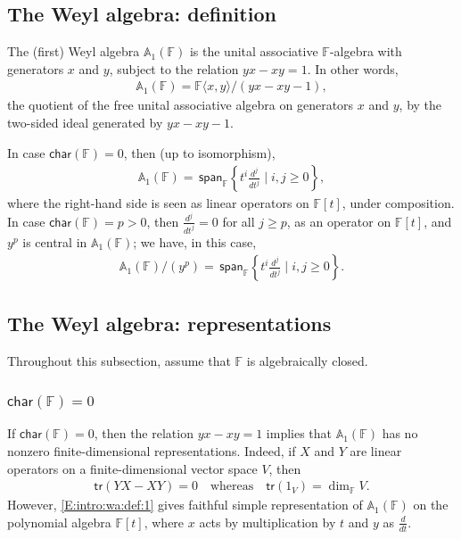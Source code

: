 \documentclass{commat}
\newcommand\tr{\mathsf{tr}}
\newcommand{\FF}{\mathbb{F}}
\newcommand{\wa}[1][1]{\mathbb{A}_{#1}}
\newcommand\chara{\mathsf {char}}
\newcommand\spann{\, \mathsf{span}}
\newcommand{\pb}[1]{\left\{ #1\right\}}
\newcommand{\seq}[1]{\left( #1\right)}
\begin{document}
\subsection{The Weyl algebra: definition}\label{SS:intro:wa:def}




The (first) Weyl algebra $\wa(\FF)$ is the unital associative $\FF$-algebra with generators $x$ and $y$, subject to the relation $yx-xy=1$.
In other words, 
\begin{align*}
	\wa(\FF)=\FF\langle x, y\rangle/\seq{yx-xy-1},
\end{align*}
the quotient of the free unital associative algebra on generators $x$ and $y$, by the two-sided ideal generated by $yx-xy-1$.

In case $\chara(\FF)=0$, then (up to isomorphism),
\begin{align}\label{E:intro:wa:def:1}
	\wa(\FF)=\spann_\FF\pb{t^i\frac{d^j}{dt^j}\mid i, j\geq 0},
\end{align}
where the right-hand side is seen as linear operators on $\FF[t]$, under composition. In case $\chara(\FF)=p>0$, then $\frac{d^j}{dt^j}=0$ for all $j\geq p$, as an operator on $\FF[t]$, and $y^p$ is central in $\wa(\FF)$; we have, in this case, 
\begin{align}\label{E:intro:wa:def:2}
	\wa(\FF)/\seq{y^p}=\spann_\FF\pb{t^i\frac{d^j}{dt^j}\mid i, j\geq 0}.
\end{align}



\subsection{The Weyl algebra: representations}\label{SS:intro:wa:reps}

Throughout this subsection, assume that $\FF$ is algebraically closed.

\subsubsection{\texorpdfstring{$\chara(\FF)=0$}{char(F)=0}}

If $\chara(\FF)=0$, then the relation $yx-xy=1$ implies that $\wa(\FF)$ has no nonzero finite-dimen\-sional representations. Indeed, if $X$ and $Y$ are linear operators on a finite-dimensional vector space $V$, then 
\begin{align*}
	\tr\seq{YX-XY}=0\quad\text{whereas}\quad \tr (1_V)=\dim_\FF V.
\end{align*} 
However, \eqref{E:intro:wa:def:1} gives faithful simple representation of $\wa(\FF)$ on the polynomial algebra $\FF[t]$, where $x$ acts by multiplication by $t$ and $y$ as $\frac{d}{dt}$.
\end{document}
